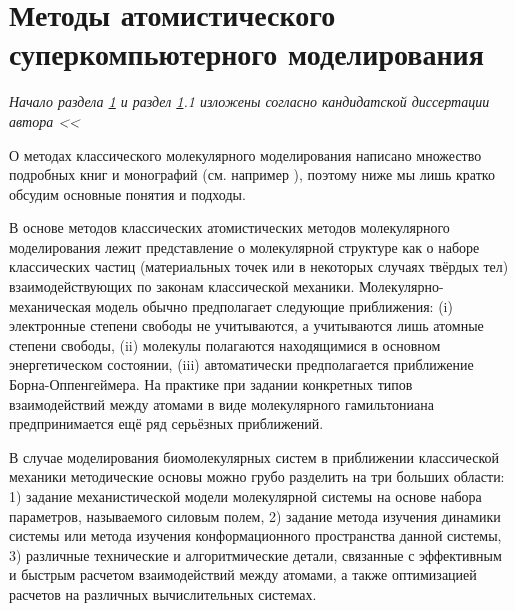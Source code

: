 \section{Методы атомистического суперкомпьютерного моделирования} \label{part1_1_md}
\textit{Начало раздела \ref{part1_1_md} и раздел \ref{part1_1_md}.1 изложены согласно кандидатской диссертации автора \cite{shaytan_thesis_kfmn_2010} << }

О методах классического молекулярного моделирования написано множество подробных книг и монографий (см. например \cite{Frenkel,allen_computer_1989}), поэтому ниже мы лишь кратко обсудим основные понятия и подходы.

В основе методов классических атомистических методов молекулярного моделирования лежит представление о молекулярной структуре как о наборе классических частиц (материальных точек или в некоторых случаях твёрдых тел) взаимодействующих по законам классической механики. Молекулярно-механическая модель обычно предполагает следующие приближения: (i) электронные степени свободы не учитываются, а учитываются лишь атомные степени свободы, (ii) молекулы полагаются находящимися в основном энергетическом состоянии, (iii) автоматически предполагается приближение Борна-Оппенгеймера. На практике при задании конкретных типов взаимодействий между атомами в виде молекулярного гамильтониана предпринимается ещё ряд серьёзных приближений.

В случае моделирования биомолекулярных систем в приближении классической механики методические основы можно грубо разделить на три больших области: 1) задание механистической модели молекулярной системы на основе набора параметров, называемого силовым полем, 2) задание метода изучения динамики системы или метода изучения конформационного пространства данной системы, 3) различные технические и алгоритмические детали, связанные с эффективным и быстрым расчетом взаимодействий между атомами, а также оптимизацией расчетов на различных вычислительных системах.



